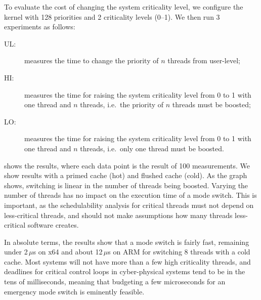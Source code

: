 To evaluate the cost of changing the system criticality level, we
configure the kernel with 128 priorities and 2 criticality levels
(0--1). We then  run 3 experiments as follows:
\iffalse                        %
\begin{itemize}
\item \textbf{UL:} measures the time to change the priority of $n$ threads from user-level;
\item \textbf{HI:} measures the time for raising the system criticality level from 0 to 1 with one \crit{low} thread and $n$
    \crit{high} threads, i.e.\ threads whose priority must be boosted upon criticality switch,
\item \textbf{LO:} measures the time for raising the system criticality level from 0 to 1 with one \crit{high} thread and
 } threads, whose priority does not need to be boosted.
\end{itemize}
\else                           %
\begin{description}
\item[UL:] measures the time to change the priority of $n$ threads from user-level;
\item[HI:] measures the time for raising the system criticality level from 0 to 1 with one  thread and $n$
     threads, i.e.\ the priority of $n$ threads must be boosted;
\item[LO:] measures the time for raising the system criticality level from 0 to 1 with one  thread and
    $n$  threads, i.e.\ only one thread must be boosted.
\end{description}
\fi

 shows the results, where each data point is the result of 100 measurements.
We show results with a primed cache (hot) and flushed cache (cold).
As the graph shows, switching is linear in the number of  threads being boosted. Varying the number
of  threads has no impact on the execution time of a mode switch.
This is important, as the schedulability analysis for critical threads
must not depend on less-critical threads, and should not make
assumptions how many threads less-critical software creates.

In absolute terms, the results show that a mode switch is fairly fast,
remaining under 2\,$\mu$s on x64 and about 12\,\(\mu\)s on ARM for switching 8 threads
with a cold cache. Most systems will not have more than a few high
criticality threads, and deadlines for critical control loops in
cyber-physical systems tend to be in the tens of milliseconds, meaning
that budgeting a few microseconds for an emergency mode switch is eminently
feasible.

